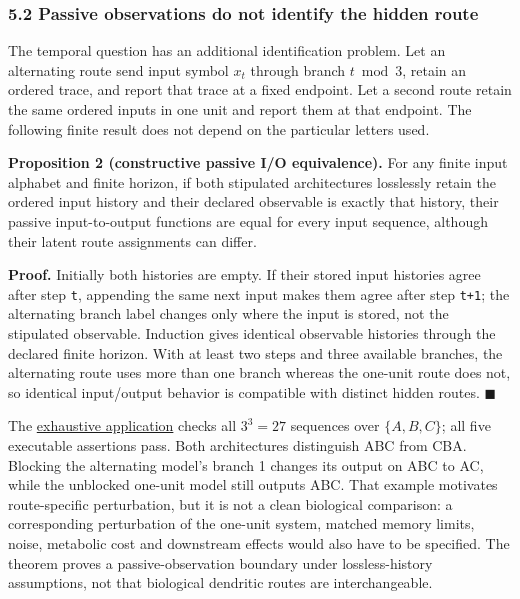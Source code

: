 \documentclass[
  american,
  11pt,
  letterpaper,
]{article}
\begin{document}
\subsubsection{5.2 Passive observations do not identify the hidden route}\label{passive-observations-do-not-identify-the-hidden-route}

The temporal question has an additional identification problem. Let an alternating route send input symbol \(x_t\) through branch \(t\bmod 3\), retain an ordered trace, and report that trace at a fixed endpoint. Let a second route retain the same ordered inputs in one unit and report them at that endpoint. The following finite result does not depend on the particular letters used.

\textbf{Proposition 2 (constructive passive I/O equivalence).} For any finite input alphabet and finite horizon, if both stipulated architectures losslessly retain the ordered input history and their declared observable is exactly that history, their passive input-to-output functions are equal for every input sequence, although their latent route assignments can differ.

\textbf{Proof.} Initially both histories are empty. If their stored input histories agree after step \texttt{t}, appending the same next input makes them agree after step \texttt{t+1}; the alternating branch label changes only where the input is stored, not the stipulated observable. Induction gives identical observable histories through the declared finite horizon. With at least two steps and three available branches, the alternating route uses more than one branch whereas the one-unit route does not, so identical input/output behavior is compatible with distinct hidden routes. \(\blacksquare\)

The \href{https://github.com/v5ma/v5ma.github.io/blob/f6d3867df89ae9dea32f763b1d55c84212c41cc6/papers/companions/five-papers-20260923/temporal/paper/applications/observational-equivalence-v03/README.md}{exhaustive application} checks all \(3^3=27\) sequences over \(\{A,B,C\}\); all five executable assertions pass. Both architectures distinguish ABC from CBA. Blocking the alternating model's branch 1 changes its output on ABC to AC, while the unblocked one-unit model still outputs ABC. That example motivates route-specific perturbation, but it is not a clean biological comparison: a corresponding perturbation of the one-unit system, matched memory limits, noise, metabolic cost and downstream effects would also have to be specified. The theorem proves a passive-observation boundary under lossless-history assumptions, not that biological dendritic routes are interchangeable.
\end{document}
